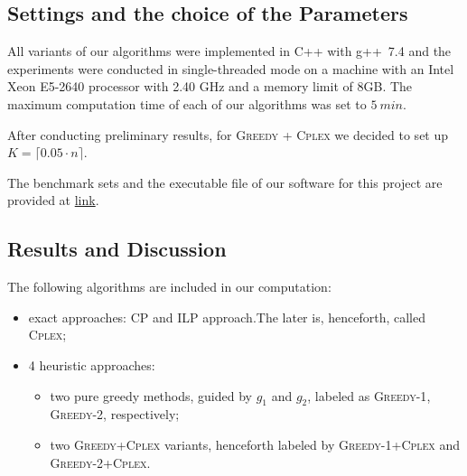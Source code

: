 \documentclass[runningheads,a4paper]{elsarticle}
\begin{document}
     \subsection{Settings and the choice of the Parameters}
      All variants of our algorithms were implemented in C++ with g++~7.4 and the experiments were conducted in single-threaded mode on a machine with an Intel Xeon E5-2640 processor with 2.40 GHz and a memory limit of 8GB. The maximum computation time of each of our algorithms was set to $5\ min$.

      After conducting preliminary results, for
        \textsc{Greedy + \textsc{Cplex}} we decided to set up $K = \lceil 0.05 \cdot n \rceil$.

     The benchmark sets and the executable file of our software for this project are provided at \href{link}{link}.
	\subsection{Results and Discussion}
        The following algorithms are included in our computation:
        \begin{itemize}
        	\item  exact approaches: CP and ILP approach.The later is, henceforth, called \textsc{Cplex};
            \item 4 heuristic approaches:
           \begin{itemize}
           	\item two pure greedy methods, guided by $g_1$ and $g_2$, labeled as \textsc{Greedy-1}, \textsc{Greedy-2}, respectively;
            \item two \textsc{Greedy+Cplex} variants, henceforth labeled by  \textsc{Greedy-1}+\textsc{Cplex} and 
            \textsc{Greedy-2}+\textsc{Cplex}. 
        \end{itemize}
    \end{itemize}
            
\end{document}
